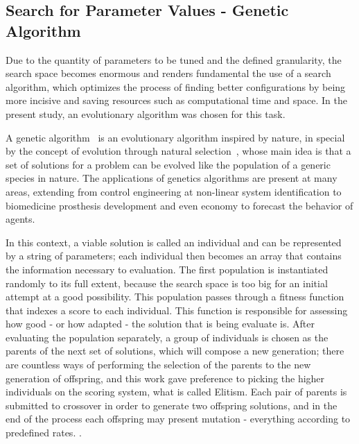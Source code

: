 \subsection{Search for Parameter Values - Genetic Algorithm} \label{subsec:GA}
	
	Due to the quantity of parameters to be tuned and the defined granularity, the search space becomes enormous and
	renders fundamental the use of a search algorithm, which optimizes the process of finding better configurations
	by being more incisive and saving resources such as computational time and space. In the present study, an
	evolutionary algorithm was chosen for this task.
	
	A genetic algorithm~\cite{GA} is an evolutionary algorithm inspired by nature, in special by the concept of
	evolution through natural selection~\cite{Darwin}, whose main idea is that a set of solutions for a problem can
	be evolved like the population of a generic species in nature. The applications of genetics algorithms are
	present at many areas, extending from control engineering at non-linear system identification to biomedicine
	prosthesis development and even economy to forecast the behavior of agents.
	
	In this context, a viable solution is called an individual and can be represented by a string of parameters; each
	individual then becomes an array that contains the information necessary to evaluation. The first population is
	instantiated randomly to its full extent, because the search space is too big for an initial attempt at a good
	possibility. This population passes through a fitness function that indexes a score to each individual. This
	function is responsible for assessing how good - or how adapted - the solution that is being evaluate is. After
	evaluating the population separately, a group of individuals is chosen as the parents of the next set of
	solutions, which will compose a new generation; there are countless ways of performing the selection of the
	parents to the new generation of offspring, and this work gave preference to picking the higher individuals on the
	scoring system, what is called Elitism. Each pair of parents is submitted to
	crossover in order to generate two offspring solutions, and in the end of the process each offspring may
	present mutation - everything according to predefined rates. .
	
